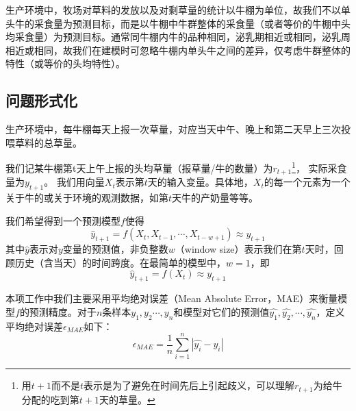 生产环境中，牧场对草料的发放以及对剩草量的统计以牛棚为单位，故我们不以单头牛的采食量为预测目标，而是以牛棚中牛群整体的采食量（或者等价的牛棚中头均采食量）为预测目标。通常同牛棚内牛的品种相同，泌乳期相近或相同，泌乳周相近或相同，故我们在建模时可忽略牛棚内单头牛之间的差异，仅考虑牛群整体的特性（或等价的头均特性）。

\subsection{问题形式化}

生产环境中，每牛棚每天上报一次草量，对应当天中午、晚上和第二天早上三次投喂草料的总草量。

我们记某牛棚第t天上午上报的头均草量（报草量/牛的数量）为$r_{t+1}$\footnote{用$t+1$而不是$t$表示是为了避免在时间先后上引起歧义，可以理解$r_{t+1}$为给牛分配的吃到第$t+1$天的草量。}，
实际采食量为$y_{t+1}$。
我们用向量$X_t$表示第$t$天的输入变量。具体地，$X_t$的每一个元素为一个关于牛的或关于环境的观测数据，如第$t$天牛的产奶量等等。

我们希望得到一个预测模型$f$使得
\begin{equation}
	\hat y_{t+1} = f(X_t, X_{t-1}, \cdots, X_{t-w+1}) \approx {y_{t+1}}
\end{equation}
其中$\hat y$表示对$y$变量的预测值，非负整数$w$（window size）表示我们在第$t$天时，回顾历史（含当天）的时间跨度。在最简单的模型中，$w=1$，即
\begin{equation}
	\hat y_{t+1} = f(X_t) \approx {y_{t+1}}
\end{equation}

本项工作中我们主要采用平均绝对误差（Mean Absolute Error，MAE）来衡量模型$f$的预测精度。对于$n$条样本$y_1, y_2 \cdots, y_{n}$和模型对它们的预测值$\hat{y_1}, \hat{y_2}, \cdots, \hat{y_{n}}$，定义平均绝对误差$\epsilon_{MAE}$如下：
\begin{equation}
	\epsilon_{MAE} = \frac 1 n \sum_{i=1}^{n} | \hat{y_i} - y_i | 
\end{equation}







